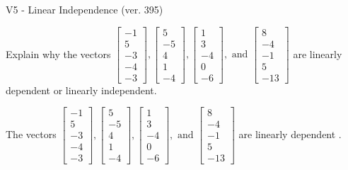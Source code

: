 \begin{exercise}
  \begin{exerciseTitle}V5 - Linear Independence (ver. 395)\end{exerciseTitle}
  \begin{exerciseStatement}
    Explain why the vectors \(\left[\begin{array}{r}
-1 \\
5 \\
-3 \\
-4 \\
-3
\end{array}\right] , \left[\begin{array}{r}
5 \\
-5 \\
4 \\
1 \\
-4
\end{array}\right] , \left[\begin{array}{r}
1 \\
3 \\
-4 \\
0 \\
-6
\end{array}\right] , \text{ and } \left[\begin{array}{r}
8 \\
-4 \\
-1 \\
5 \\
-13
\end{array}\right]\) are linearly dependent or linearly independent.	


  \end{exerciseStatement}
  \begin{exerciseAnswer}
   The vectors \(\left[\begin{array}{r}
-1 \\
5 \\
-3 \\
-4 \\
-3
\end{array}\right] , \left[\begin{array}{r}
5 \\
-5 \\
4 \\
1 \\
-4
\end{array}\right] , \left[\begin{array}{r}
1 \\
3 \\
-4 \\
0 \\
-6
\end{array}\right] , \text{ and } \left[\begin{array}{r}
8 \\
-4 \\
-1 \\
5 \\
-13
\end{array}\right]\) are 
  	 linearly dependent  .
  


  \end{exerciseAnswer}
\end{exercise}